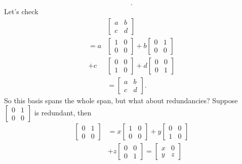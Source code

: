\documentclass{report}
\begin{document}
\begin{itemize}
\begin{align*}
            .\end{align*}
            Let's check 
            \begin{align*}
                &\begin{bmatrix} a & b \\ c & d \end{bmatrix} \\
                =  a &\begin{bmatrix} 1 & 0 \\ 0 & 0 \end{bmatrix} + b \begin{bmatrix}0 & 1 \\ 0 & 0  \end{bmatrix} \\
                +c&\begin{bmatrix} 0 & 0 \\ 1 & 0\end{bmatrix} + d \begin{bmatrix} 0 & 0 \\ 0 & 1 \end{bmatrix} \\
                  &=\begin{bmatrix}
                      a & b \\ c & d 
                \end{bmatrix}
            .\end{align*}
            So this basis spans the whole span, but what about redundancies? Suppose $\begin{bmatrix} 0 & 1 \\ 0 & 0 \end{bmatrix} $ is redundant, then
            \begin{align*}
                \begin{bmatrix} 0 & 1 \\ 0 & 0 \end{bmatrix} &= x\begin{bmatrix} 1 & 0 \\ 0 & 0 \end{bmatrix} +  y \begin{bmatrix} 0 & 0 \\ 1 & 0\end{bmatrix} \\
                                  &+z\begin{bmatrix} 0 & 0 \\ 0 & 1\end{bmatrix} =\begin{bmatrix} x & 0 \\ y & z\end{bmatrix}

\end{align*}
\end{itemize}
\end{document}
